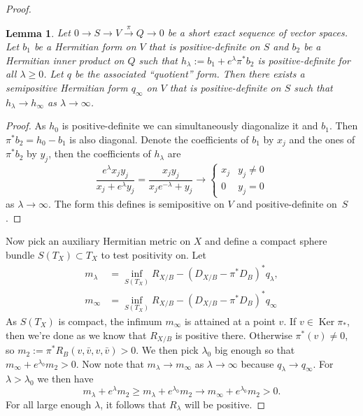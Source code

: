 \documentclass[10pt,a4paper]{amsart}
\newtheorem{lemm}[theo]{Lemma}
\theoremstyle{definition}
\DeclareMathOperator{\Ker}{Ker}
\begin{document}
\begin{proof}
\begin{lemm}
\label{lemm:limit-form}
Let $0 \to S \to V \stackrel{\pi}{\to} Q \to 0$ be a short exact sequence of vector spaces.
Let $b_{1}$ be a Hermitian form on $V$ that is positive-definite on $S$ and $b_{2}$ be a Hermitian inner product on $Q$ such that $h_{\lambda} := b_{1} + e^{\lambda} \pi^{*} b_{2}$ is positive-definite for all $\lambda \geq 0$.
Let $q$ be the associated ``quotient'' form.
Then there exists a semipositive Hermitian form $q_{\infty}$ on $V$ that is positive-definite on $S$ such that $h_{\lambda} \to h_{\infty}$ as $\lambda \to \infty$.
\end{lemm}


\begin{proof}
As $h_{0}$ is positive-definite we can simultaneously diagonalize it and $b_{1}$.
Then $\pi^{*}b_{2} = h_{0} - b_{1}$ is also diagonal.
Denote the coefficients of $b_{1}$ by $x_{j}$ and the ones of $\pi^{*}b_{2}$ by $y_{j}$, then the coefficients of $h_{\lambda}$ are
\[
  \frac{e^{\lambda}x_{j} y_{j}}{x_{j} + e^{\lambda} y_{j}}
  = \frac{x_{j} y_{j}}{x_{j}e^{-\lambda} + y_{j}}
  \to
  \begin{cases}
    x_{j} & y_{j} \not= 0
    \\
    0 & y_{j} = 0
  \end{cases}
\]
as $\lambda \to \infty$.
The form this defines is semipositive on $V$ and positive-definite on~$S$.%
\end{proof}

Now pick an auxiliary Hermitian metric on $X$ and define a compact sphere bundle
$S(T_X) \subset T_X$ to test positivity on.
Let
\begin{align*}
m_\lambda &=
\inf_{S(T_X)} R_{X/B}
- (D_{X/B} - \pi^* D_{B})^* q_{\lambda},
\\
m_\infty &=
\inf_{S(T_X)} R_{X/B}
- (D_{X/B} - \pi^* D_{B})^* q_{\infty}
\end{align*}
As $S(T_X)$ is compact, the infimum $m_\infty$ is attained at a point $v$.
If $v \in \Ker \pi_*$, then we're done as we know that $R_{X/B}$ is positive
there.
Otherwise $\pi^*(v) \not= 0$, so $m_2 := \pi^*R_B(v, \bar v, v, \bar v) > 0$.
We then pick $\lambda_0$ big enough so that $m_\infty + e^{\lambda_0} m_2 > 0$.
Now note that
$m_\lambda \to m_\infty$ as $\lambda \to \infty$ because $q_{\lambda} \to
q_{\infty}$.
For $\lambda > \lambda_0$ we then have
$$
m_\lambda + e^\lambda m_2
\geq m_\lambda + e^{\lambda_0} m_2
\to m_\infty  + e^{\lambda_0} m_2
> 0.
$$
For all large enough $\lambda$, it follows that $R_\lambda$ will be positive.
\end{proof}
\end{document}

